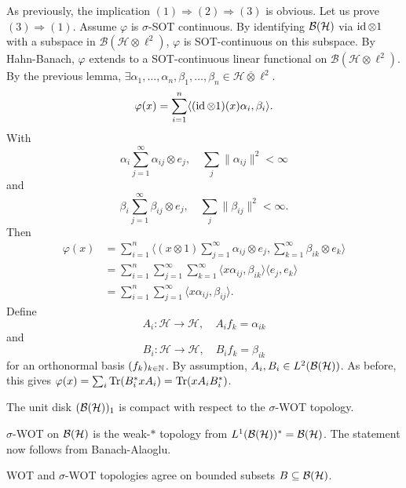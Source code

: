 \begin{myproof}
  As previously, the implication $(1) \Rightarrow (2) \Rightarrow (3)$ is obvious.
  Let us prove $(3) \Rightarrow (1)$. Assume $\varphi$ is $\sigma$-SOT continuous.
  By identifying $\operatorname{\mathcal{B} (\mathcal{H})}$ via $\operatorname{id} \otimes 1$ with a subspace in $\mathcal{B} (\mathcal{H} \otimes \ell^2)$,
  $\varphi$ is SOT-continuous on this subspace. By Hahn-Banach, $\varphi$ extends to a SOT-continuous 
  linear functional on $\mathcal{B} (\mathcal{H} \otimes \ell^2)$.
  By the previous lemma, $\exists \alpha_1, \dots, \alpha_n, \beta_1, \dots, \beta_n \in \mathcal{H} \overline{\otimes} \ell^2$.
  $$\varphi(x) = \sum_{i = 1} ^n \langle (\operatorname{id} \otimes 1) (x) \alpha_i, \beta_i \rangle.$$
  With 
  $$\alpha_i \sum_{j = 1} ^\infty \alpha_{ij} \otimes e_j, \quad \sum_j \| \alpha_{ij} \|^2 < \infty$$
  and 
  $$\beta_i \sum_{j = 1} ^\infty \beta_{ij} \otimes e_j, \quad \sum_j \| \beta_{ij} \|^2 < \infty.$$
  Then 
  \begin{align*}
    \varphi(x) &= \sum_{i = 1} ^n \langle (x \otimes 1) \sum_{j = 1} ^\infty \alpha_{ij} \otimes e_j, \sum_{k = 1} ^\infty \beta_{ik} \otimes e_k\rangle\\
    &= \sum_{i = 1} ^n \sum_{j = 1} ^\infty \sum_{k = 1} ^\infty \langle x \alpha_{ij}, \beta_{ik}\rangle \langle e_j, e_k\rangle\\
    &= \sum_{i = 1} ^n \sum_{j = 1} ^\infty \langle x \alpha_{ij}, \beta_{ij}\rangle.
  \end{align*}
  Define $$A_i : \mathcal{H} \to \mathcal{H},\quad A_i f_k = \alpha_{ik}$$
  and $$B_i : \mathcal{H} \to \mathcal{H},\quad B_i f_k = \beta_{ik}$$
  for an orthonormal basis $(f_k)_{k \in \mathbb {N}}$. By assumption, $A_i, B_i \in L^2 (\operatorname{\mathcal{B} (\mathcal{H})})$.
  As before, this gives $\varphi (x) = \sum_i \operatorname{Tr} (B_i ^* x A_i) = \operatorname{Tr} (x A_i B_i^*)$.
\end{myproof}

\begin{corollary}\label{cor:4.2}
  The unit disk $(\operatorname{\mathcal{B} (\mathcal{H})})_1$ is compact with respect to the $\sigma$-WOT topology.
\end{corollary}

\begin{myproof}
  $\sigma$-WOT on $\operatorname{\mathcal{B} (\mathcal{H})}$ is the weak-$*$ topology from $L^1 (\operatorname{\mathcal{B} (\mathcal{H})})^* = \operatorname{\mathcal{B} (\mathcal{H})}$.
  The statement now follows from Banach-Alaoglu.
\end{myproof}

\begin{corollary}\label{cor:4.3}
  WOT and $\sigma$-WOT topologies agree on bounded subsets $B \subseteq \operatorname{\mathcal{B} (\mathcal{H})}$.
\end{corollary}

